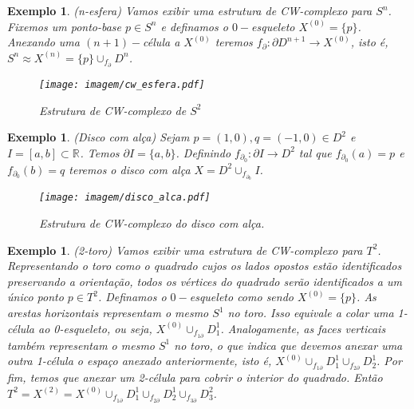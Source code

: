 \documentclass[12pt]{book}
\newtheorem{exemplo}[teorema]{Exemplo}
\newcommand{\celula}[2]{D^{#1}_{#2}}
\newcommand{\real}[1]{\mathbb{R}^{#1}}
\newcommand{\reta}{\real{}}
\newcommand{\skeleton}[1]{X^{(#1)}}
\begin{document}
	\begin{exemplo}
		(n-esfera) Vamos exibir uma estrutura de CW-complexo para $S^{n}$. Fixemos um ponto-base $p \in S^{n}$ e definamos o $0-$esqueleto $\skeleton{0}=\{p\}$. Anexando uma $(n+1)-$célula a $\skeleton{0}$ teremos $f_{\partial}: \partial D^{n+1} \to \skeleton{0}$, isto é, $S^{n} \approx \skeleton{n} = \{p\}\cup_{f_{\partial}} \celula{n}{}$.
		\begin{figure}[!h]
			\centering
			\texttt{[image: imagem/cw\_esfera.pdf]}
			\caption{Estrutura de CW-complexo de $S^{2 }$}
		\end{figure}
	\end{exemplo}

	
	\begin{exemplo}
		(Disco com alça) Sejam $p=(1,0), q=(-1,0) \in D^{2}$ e $I=[a,b] \subset \reta$. Temos $\partial I=\{a,b\}$. Definindo $f_{\partial_{0}}: \partial I \to D^{2}$ tal que $f_{\partial_{0}}(a)=p$ e $f_{\partial_{0}}(b)=q$ teremos o disco com alça $X=D^{2}\cup_{f_{\partial_{0}}}I$.
		
		\begin{figure}[!h]
			\centering
			\texttt{[image: imagem/disco\_alca.pdf]}
			\caption{Estrutura de CW-complexo do disco com alça.}
		\end{figure}   
	\end{exemplo}
	
	\begin{exemplo}
		(2-toro) Vamos exibir uma estrutura de CW-complexo para $T^{2}$. Representando o toro como o quadrado cujos os lados opostos estão identificados preservando a orientação, todos os vértices do quadrado serão identificados a um único ponto $p \in T^{2}$. Definamos o $0-$esqueleto como sendo $\skeleton{0} = \{p\}$. As arestas horizontais representam o mesmo $S^{1}$ no toro. Isso equivale a colar uma 1-célula ao 0-esqueleto, ou seja, $\skeleton{0}\cup_{f_{1\partial}}\celula{1}{1}$. Analogamente, as faces verticais também representam o mesmo $S^{1}$ no toro, o que indica que devemos anexar uma outra 1-célula o espaço anexado anteriormente, isto é, $\skeleton{0}\cup_{f_{1\partial}}\celula{1}{1}\cup_{f_{2\partial}}\celula{1}{2}$. Por fim, temos que anexar um 2-célula para cobrir o interior do quadrado. Então $T^{2} =\skeleton{2} = \skeleton{0}\cup_{f_{1\partial}}\celula{1}{1}\cup_{f_{2\partial}}\celula{1}{2}\cup_{f_{3\partial}}\celula{2}{3}$.
	\end{exemplo}
	
\end{document}
